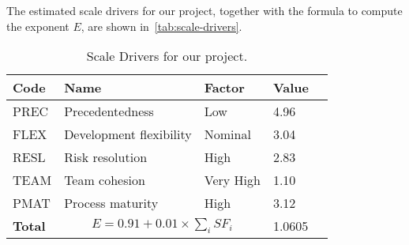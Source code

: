 The estimated scale drivers for our project, together with the formula to compute the exponent $E$, are shown in~\autoref{tab:scale-drivers}.

\begin{table}[p]
    \centering
    \begin{tabular}{| l | l | l | l | l |}
        \hline
        \textbf{Code}   & \textbf{Name}             & \textbf{Factor}   & \textbf{Value}    \\
        \hline
        PREC            & Precedentedness           & Low               & 4.96                 \\
        \hline
        FLEX            & Development flexibility   & Nominal           & 3.04                 \\
        \hline
        RESL            & Risk resolution           & High              & 2.83                 \\
        \hline
        TEAM            & Team cohesion             & Very High         & 1.10                 \\
        \hline
        PMAT            & Process maturity          & High              & 3.12                 \\
        \hline
        \textbf{Total}  & \multicolumn{2}{|c|}{$E=0.91 + 0.01 \times \sum_{i}SF_i$}    & 1.0605       \\
        \hline
    \end{tabular}
    \caption{Scale Drivers for our project.}
    \label{tab:scale-drivers}
\end{table}
